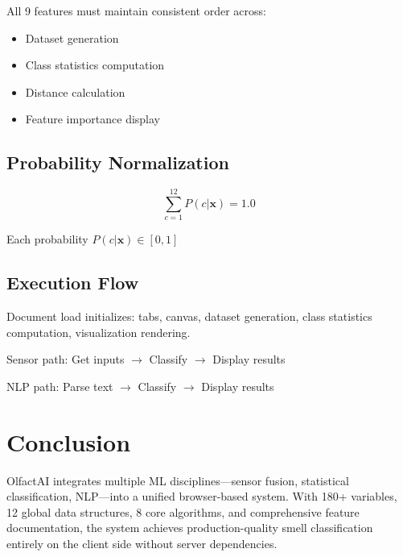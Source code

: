 \documentclass[10pt]{article}
\begin{document}
All 9 features must maintain consistent order across:
\begin{itemize}
    \item Dataset generation
    \item Class statistics computation
    \item Distance calculation
    \item Feature importance display
\end{itemize}

\subsection{Probability Normalization}

\[
\sum_{c=1}^{12} P(c|\mathbf{x}) = 1.0
\]

Each probability $P(c|\mathbf{x}) \in [0, 1]$

\subsection{Execution Flow}

Document load initializes: tabs, canvas, dataset generation, class statistics computation, visualization rendering.

Sensor path: Get inputs $\to$ Classify $\to$ Display results

NLP path: Parse text $\to$ Classify $\to$ Display results

\section{Conclusion}

OlfactAI integrates multiple ML disciplines---sensor fusion, statistical classification, NLP---into a unified browser-based system. With 180+ variables, 12 global data structures, 8 core algorithms, and comprehensive feature documentation, the system achieves production-quality smell classification entirely on the client side without server dependencies.
\end{document}
